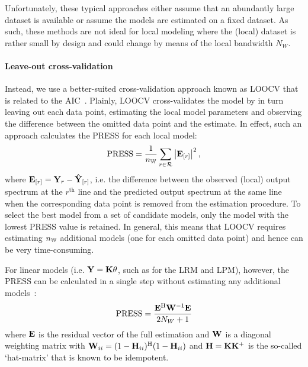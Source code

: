 \begin{remark}
Unfortunately, these typical approaches either assume that an abundantly large dataset is available or  assume the models are estimated on  a fixed dataset.
As such, these methods are not ideal for local modeling where the (local) dataset is rather small by design and could change by means of the local bandwidth $N_W$.
\end{remark}

\paragraph{Leave-out cross-validation}
Instead, we use a better-suited cross-validation approach known as \gls{LOOCV} that is related to the \gls{AIC}~\citep{Stone1977}.
Plainly, \gls{LOOCV} cross-validates the model by in turn leaving out each data point, estimating the local model parameters and observing the difference between the omitted data point and the estimate.
In effect, such an approach calculates the \gls{PRESS} for each local model:
\begin{equation}
 \PRESS = 
 \frac{1}{\nWind} 
  \sum_{r \in \LocalShifts{}}
    \abs{\ignoring{r}{\LocalVector{E}}}^2
    \text{,}
\label{eq:PRESS-general}
\end{equation}
where $\ignoring{r}{\LocalVector{E}} = \LocalVector{Y}_{r} - \ignoring{r}{\LocalVector{\estimated{Y}}}$, i.e. the difference between the observed (local) output spectrum at the $r^{\text{th}}$ line and the predicted output spectrum at the same line when the corresponding data point is removed from the estimation procedure.
To select the best model from a set of candidate models, only the model with the lowest \gls{PRESS} value is retained.
In general, this means that \gls{LOOCV} requires estimating $\nWind$ additional models (one for each omitted data point) and hence can be very time-consuming.

For linear models (i.e. $\LocalVector{Y} = \LocalMatrix{K} \LocalVector{\theta}$, such as for the \gls{LRM} and \gls{LPM}), however, the \gls{PRESS} can be calculated in a single step without estimating any additional models~\citep[Sec.~12.3.2]{Seber2003}:
\begin{equation}
\PRESS = \frac{\LocalVector{E}^{\HT} \LocalVector{W}^{-1} \LocalVector{E}}{2N_W + 1}
\end{equation}
where $\LocalVector{E}$ is the residual vector of the full estimation and $\LocalVector{W}$ is a diagonal weighting matrix with $\LocalVector{W}_{ii} = (1 - \LocalVector{H}_{ii})^{\HT} (1 - \LocalVector{H}_{ii})$ and
$\LocalVector{H} = \LocalMatrix{K} \pinv{\LocalMatrix{K}}$ is the so-called `hat-matrix' that is known to be idempotent.

